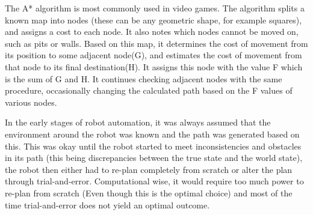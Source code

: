 The A* algorithm is most commonly used in video games. The algorithm splits a known map into nodes (these can be any geometric shape, for example squares), and assigns a cost to each node. It also notes which nodes cannot be moved on, such as pits or walls. Based on this map, it determines the cost of movement from its position to some adjacent node(G), and estimates the cost of movement from that node to its final destination(H). It assigns this node with the value F which is the sum of G and H. It continues checking adjacent nodes with the same procedure, occasionally changing the calculated path based on the F values of various nodes\cite{astar}.

In the early stages of robot automation, it was always assumed that the environment around the robot was known and the path was generated based on this. This was okay until the robot started to meet inconsistencies and obstacles in its path (this being discrepancies between the true state and the world state), the robot then either had to re-plan completely from scratch or alter the plan through trial-and-error. Computational wise, it would require too much power to re-plan from scratch (Even though this is the optimal choice) and most of the time trial-and-error does not yield an optimal outcome.

